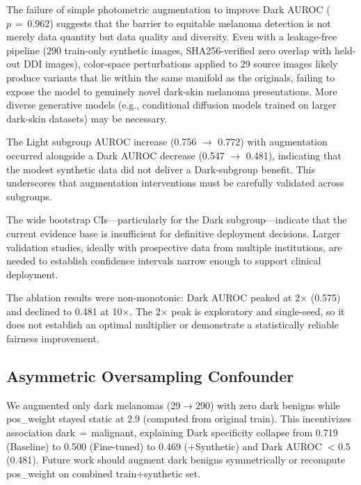 The failure of simple photometric augmentation to improve Dark AUROC ($p\,{=}\,0.962$) suggests that the barrier to equitable melanoma detection is not merely data quantity but data quality and diversity. Even with a leakage-free pipeline (290 train-only synthetic images, SHA256-verified zero overlap with held-out DDI images), color-space perturbations applied to 29 source images likely produce variants that lie within the same manifold as the originals, failing to expose the model to genuinely novel dark-skin melanoma presentations. More diverse generative models (e.g., conditional diffusion models trained on larger dark-skin datasets) may be necessary.

The Light subgroup AUROC increase (0.756 $\rightarrow$ 0.772) with augmentation occurred alongside a Dark AUROC decrease (0.547 $\rightarrow$ 0.481), indicating that the modest synthetic data did not deliver a Dark-subgroup benefit. This underscores that augmentation interventions must be carefully validated across subgroups.

The wide bootstrap CIs---particularly for the Dark subgroup---indicate that the current evidence base is insufficient for definitive deployment decisions. Larger validation studies, ideally with prospective data from multiple institutions, are needed to establish confidence intervals narrow enough to support clinical deployment.

The ablation results were non-monotonic: Dark AUROC peaked at 2$\times$ (0.575) and declined to 0.481 at 10$\times$. The 2$\times$ peak is exploratory and single-seed, so it does not establish an optimal multiplier or demonstrate a statistically reliable fairness improvement.

\subsection{Asymmetric Oversampling Confounder}

We augmented only dark melanomas (29$\to$290) with zero dark benigns while pos\_weight stayed static at 2.9 (computed from original train). This incentivizes association dark\,$=$\,malignant, explaining Dark specificity collapse from 0.719 (Baseline) to 0.500 (Fine-tuned) to 0.469 (+Synthetic) and Dark AUROC $< 0.5$ (0.481). Future work should augment dark benigns symmetrically or recompute pos\_weight on combined train+synthetic set.
